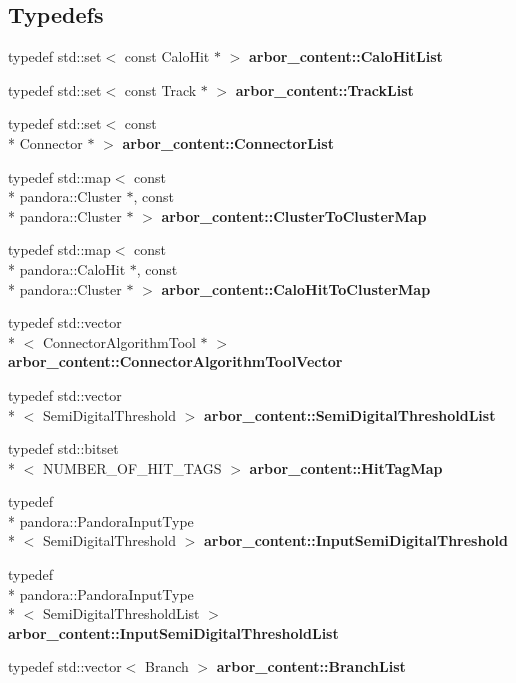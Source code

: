 \subsection*{Typedefs}
\begin{DoxyCompactItemize}
\item 
typedef std\+::set$<$ const Calo\+Hit $\ast$ $>$ {\bf arbor\+\_\+content\+::\+Calo\+Hit\+List}
\item 
typedef std\+::set$<$ const Track $\ast$ $>$ {\bf arbor\+\_\+content\+::\+Track\+List}
\item 
typedef std\+::set$<$ const \\*
Connector $\ast$ $>$ {\bf arbor\+\_\+content\+::\+Connector\+List}
\item 
typedef std\+::map$<$ const \\*
pandora\+::\+Cluster $\ast$, const \\*
pandora\+::\+Cluster $\ast$ $>$ {\bf arbor\+\_\+content\+::\+Cluster\+To\+Cluster\+Map}
\item 
typedef std\+::map$<$ const \\*
pandora\+::\+Calo\+Hit $\ast$, const \\*
pandora\+::\+Cluster $\ast$ $>$ {\bf arbor\+\_\+content\+::\+Calo\+Hit\+To\+Cluster\+Map}
\item 
typedef std\+::vector\\*
$<$ Connector\+Algorithm\+Tool $\ast$ $>$ {\bf arbor\+\_\+content\+::\+Connector\+Algorithm\+Tool\+Vector}
\item 
typedef std\+::vector\\*
$<$ Semi\+Digital\+Threshold $>$ {\bf arbor\+\_\+content\+::\+Semi\+Digital\+Threshold\+List}
\item 
typedef std\+::bitset\\*
$<$ N\+U\+M\+B\+E\+R\+\_\+\+O\+F\+\_\+\+H\+I\+T\+\_\+\+T\+A\+G\+S $>$ {\bf arbor\+\_\+content\+::\+Hit\+Tag\+Map}
\item 
typedef \\*
pandora\+::\+Pandora\+Input\+Type\\*
$<$ Semi\+Digital\+Threshold $>$ {\bf arbor\+\_\+content\+::\+Input\+Semi\+Digital\+Threshold}
\item 
typedef \\*
pandora\+::\+Pandora\+Input\+Type\\*
$<$ Semi\+Digital\+Threshold\+List $>$ {\bf arbor\+\_\+content\+::\+Input\+Semi\+Digital\+Threshold\+List}
\item 
typedef std\+::vector$<$ Branch $>$ {\bf arbor\+\_\+content\+::\+Branch\+List}
\end{DoxyCompactItemize}
